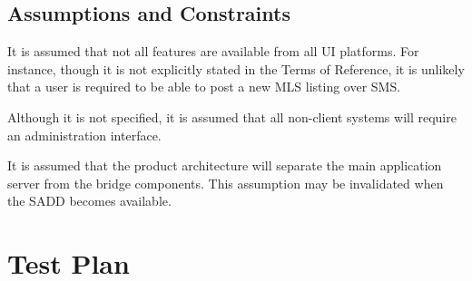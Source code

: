 \documentclass[11pt]{wacomepd}
\begin{document}
\section {Assumptions and Constraints}
It is assumed that not all features are available from all UI platforms.  For instance, though it is
not explicitly stated in the Terms of Reference, it is unlikely that a user is required to be able
to post a new MLS listing over SMS.

Although it is not specified, it is assumed that all non-client systems will require an
administration interface.

It is assumed that the product architecture will separate the main application server from the
bridge components.  This assumption may be invalidated when the SADD becomes available.


\chapter{Test Plan}
\end{document}
